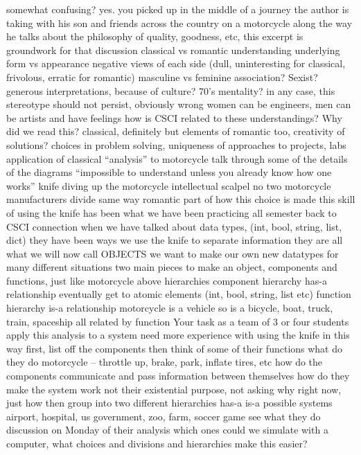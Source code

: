 \documentclass{article}
\begin{document}
somewhat confusing? yes.
you picked up in the middle of a journey the author is taking with his son
and friends across the country on a motorcycle
along the way he talks about the philosophy of quality, goodness, etc,
this excerpt is groundwork for that discussion
classical vs romantic understanding
underlying form vs appearance
negative views of each side (dull, uninteresting for classical, frivolous, erratic for romantic)
masculine vs feminine association? Sexist?
generous interpretations, because of culture? 70’s mentality?
in any case, this stereotype should not persist, obviously wrong
women can be engineers, men can be artists and have feelings
how is CSCI related to these understandings? Why did we read this?
classical, definitely
but elements of romantic too, creativity of solutions?
choices in problem solving, uniqueness of approaches to projects, labs
application of classical “analysis” to motorcycle
talk through some of the details of the diagrams
“impossible to understand unless you already know how one works”
knife diving up the motorcycle
intellectual scalpel
no two motorcycle manufacturers divide same way
romantic part of how this choice is made
this skill of using the knife has been what we have been practicing all semester
back to CSCI connection
when we have talked about data types, (int, bool, string, list, dict)
they have been ways we use the knife to separate information
they are all what we will now call OBJECTS
we want to make our own new datatypes for many different situations
two main pieces to make an object, components and functions, just like motorcycle above
hierarchies
component hierarchy
has-a relationship
eventually get to atomic elements (int, bool, string, list etc)
function hierarchy
is-a relationship
motorcycle is a vehicle
so is a bicycle, boat, truck, train, spaceship
all related by function
Your task as a team of 3 or four students
apply this analysis to a system
need more experience with using the knife in this way
first, list off the components
then think of some of their functions
what do they do
motorcycle – throttle up, brake, park, inflate tires, etc
how do the components communicate and pass information between themselves
how do they make the system work
not their existential purpose, not asking why right now, just how
then group into two different hierarchies
has-a
is-a
possible systems
airport, hospital, us government, zoo, farm, soccer game
see what they do
discussion on Monday of their analysis
which ones could we simulate with a computer,
what choices and divisions and hierarchies make this easier?
\end{document}
